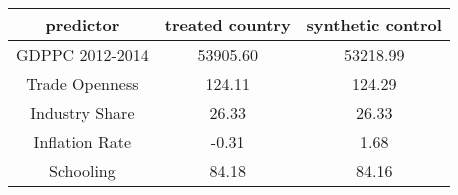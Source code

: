 \begin{tabular}{c|c|c}
predictor&\textbf{treated country}&\textbf{synthetic control}\\
\hline 
GDPPC 2012-2014 & 53905.60 & 53218.99\\
Trade Openness & 124.11 & 124.29\\
Industry Share & 26.33 & 26.33\\
Inflation Rate & -0.31 & 1.68\\
Schooling & 84.18 & 84.16\\
\hline
\end{tabular}